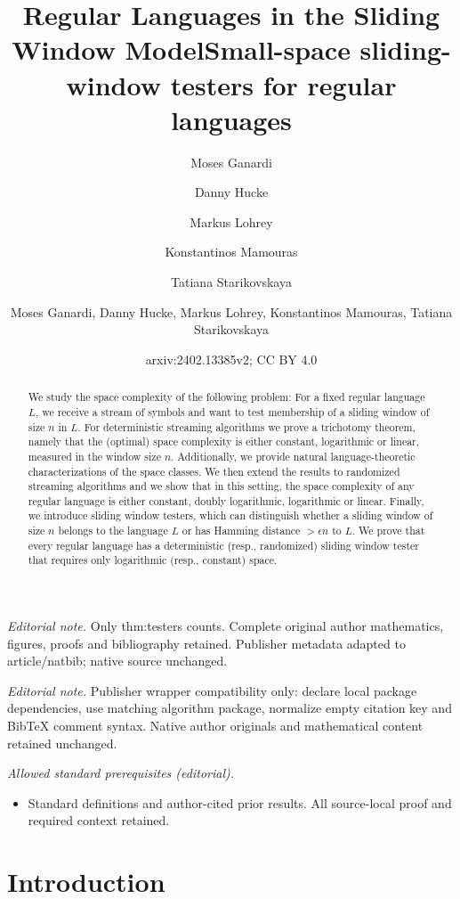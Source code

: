 \documentclass{article}\usepackage[a4paper,margin=20mm]{geometry}
\title{Regular Languages in the Sliding Window Model}
\author{Moses Ganardi \and Danny Hucke \and Markus Lohrey \and Konstantinos Mamouras \and Tatiana Starikovskaya}\date{}
\title{Small-space sliding-window testers for regular languages}
\author{Moses Ganardi, Danny Hucke, Markus Lohrey, Konstantinos Mamouras, Tatiana Starikovskaya}
\date{arxiv:2402.13385v2; CC BY 4.0}
\begin{document}
\maketitle
\noindent\textit{Editorial note.} Only thm:testers counts. Complete original author mathematics, figures, proofs and bibliography retained. Publisher metadata adapted to article/natbib; native source unchanged.\par\medskip
\noindent\textit{Editorial note.} Publisher wrapper compatibility only: declare local package dependencies, use matching algorithm package, normalize empty citation key and BibTeX comment syntax. Native author originals and mathematical content retained unchanged.\par\medskip
\noindent\textit{Allowed standard prerequisites (editorial).}\begin{itemize}
\item Standard definitions and author-cited prior results. All source-local proof and required context retained.
\end{itemize}\medskip
\maketitle

\begin{abstract}
We study the space complexity of the following problem:
For a fixed regular language $L$, we receive a stream of symbols and want to test membership of a sliding window of size $n$ in $L$.
For deterministic streaming algorithms we prove a trichotomy theorem,
namely that the (optimal) space complexity is either constant, logarithmic or linear,
measured in the window size $n$.
Additionally, we provide natural language-theoretic characterizations
of the space classes.
We then extend the results to randomized streaming algorithms and we show that in this setting, the space complexity of any regular language is either constant, doubly logarithmic, logarithmic or linear.
Finally, we introduce sliding window testers, which can distinguish
whether a sliding window of size $n$ belongs to the language $L$ or
has Hamming distance $> \epsilon n$ to $L$.
We prove that every regular language has a deterministic (resp., randomized) sliding window tester
that requires only logarithmic (resp., constant) space.
\end{abstract}






\section{Introduction}
\end{document}

